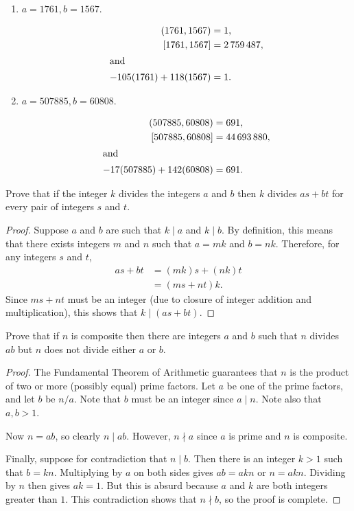 \begin{enumerate}
\item
  $a = 1761, b = 1567$.
  \begin{solution}
    \begin{align*}
      (1761, 1567) &= 1, \\
      [1761, 1567] &= 2\,759\,487, \\
      \intertext{and}
      -105(1761) + 118(1567) &= 1. \qedhere
    \end{align*}
  \end{solution}

\item
  $a = 507885, b = 60808$.
  \begin{solution}
    \begin{align*}
      (507885, 60808) &= 691, \\
      [507885, 60808] &= 44\,693\,880, \\
      \intertext{and}
      -17(507885) + 142(60808) &= 691. \qedhere
    \end{align*}
  \end{solution}

\end{enumerate}

 Prove that if the integer $k$ divides the integers $a$
and $b$ then $k$ divides $as + bt$ for every pair of integers $s$ and
$t$.
\begin{proof}
  Suppose $a$ and $b$ are such that $k\mid a$ and $k\mid b$. By
  definition, this means that there exists integers $m$ and $n$ such
  that $a = mk$ and $b = nk$. Therefore, for any integers $s$ and $t$,
  \begin{align*}
    as + bt &= (mk)s + (nk)t \\
            &= (ms + nt)k.
  \end{align*}
  Since $ms + nt$ must be an integer (due to closure of integer
  addition and multiplication), this shows that $k\mid(as + bt)$.
\end{proof}

 Prove that if $n$ is composite then there are integers
$a$ and $b$ such that $n$ divides $ab$ but $n$ does not divide either
$a$ or $b$.
\begin{proof}
  The Fundamental Theorem of Arithmetic guarantees that $n$ is the
  product of two or more (possibly equal) prime factors. Let $a$ be
  one of the prime factors, and let $b$ be $n / a$. Note that $b$ must
  be an integer since $a\mid n$. Note also that $a,b > 1$.

  Now $n = ab$, so clearly $n \mid ab$. However, $n \nmid a$ since $a$
  is prime and $n$ is composite.

  Finally, suppose for contradiction that $n\mid b$. Then there is an
  integer $k > 1$ such that $b = kn$. Multiplying by $a$ on both sides
  gives $ab = akn$ or $n = akn$. Dividing by $n$ then gives $ak =
  1$. But this is absurd because $a$ and $k$ are both integers greater
  than $1$. This contradiction shows that $n\nmid b$, so the proof is
  complete.
\end{proof}

